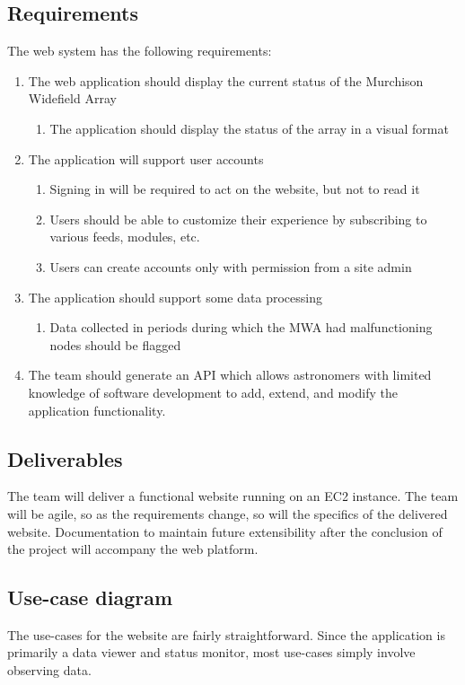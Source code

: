 \documentclass[12pt]{article}
\begin{document}
\begin{spacing}{1.5}
\section{Requirements}
The web system has the following requirements:
\begin{enumerate}
\item The web application should display the current status of the Murchison Widefield Array
	\begin{enumerate}
	\item The application should display the status of the array in a visual format
	\end{enumerate}
\item The application will support user accounts
	\begin{enumerate}
	\item Signing in will be required to act on the website, but not to read it
	\item Users should be able to customize their experience by subscribing to various feeds, modules, etc.
	\item Users can create accounts only with permission from a site admin
	\end{enumerate}
\item The application should support some data processing
	\begin{enumerate}
	\item Data collected in periods during which the MWA had malfunctioning nodes should be flagged
	\end{enumerate}
\item The team should generate an API which allows astronomers with limited knowledge of software development to add, extend, and modify the application functionality.
\end{enumerate}

\subsection{Deliverables}
The team will deliver a functional website running on an EC2 instance. The team will be agile, so as the requirements change, so will the specifics of the delivered website. Documentation to maintain future extensibility after the conclusion of the project will accompany the web platform.

\subsection{Use-case diagram}
The use-cases for the website are fairly straightforward. Since the application is primarily a data viewer and status monitor, most use-cases simply involve observing data.

\end{spacing}
\end{document}
